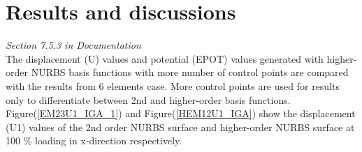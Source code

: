 \documentclass[12pt]{article}
\begin{document}
\newpage

\section{Results and discussions}
\emph{Section 7.5.3 in Documentation}\\

The displacement (U) values and potential (EPOT) values generated with higher-order NURBS basis functions with more number of control points are compared with the results from 6 elements case.
More control points are used for results only to differentiate between 2nd and higher-order basis functions.
\\
Figure(\ref{EM23U1_IGA_1}) and Figure(\ref{HEM12U1_IGA}) show the displacement (U1) values of the 2nd order NURBS surface and higher-order NURBS surface at 100 \% loading in x-direction respectively. \\
\end{document}
